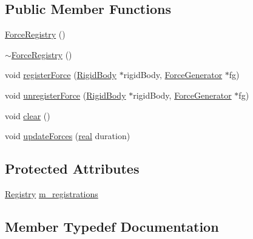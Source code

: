 \subsection*{Public Member Functions}
\begin{DoxyCompactItemize}
\item 
\mbox{\hyperlink{classr3_1_1_force_registry_a6830132c53a756ebf3e6621195f51b17}{Force\+Registry}} ()
\item 
\mbox{\hyperlink{classr3_1_1_force_registry_a322cdf54468a6f59610562a7bfc2e60d}{$\sim$\+Force\+Registry}} ()
\item 
void \mbox{\hyperlink{classr3_1_1_force_registry_a2b86303ed6ac2082606b298301f9957c}{register\+Force}} (\mbox{\hyperlink{classr3_1_1_rigid_body}{Rigid\+Body}} $\ast$rigid\+Body, \mbox{\hyperlink{classr3_1_1_force_generator}{Force\+Generator}} $\ast$fg)
\item 
void \mbox{\hyperlink{classr3_1_1_force_registry_a3a6163fed4266bd6e18ebad2c5c939cd}{unregister\+Force}} (\mbox{\hyperlink{classr3_1_1_rigid_body}{Rigid\+Body}} $\ast$rigid\+Body, \mbox{\hyperlink{classr3_1_1_force_generator}{Force\+Generator}} $\ast$fg)
\item 
void \mbox{\hyperlink{classr3_1_1_force_registry_ab1c31bc403d998af16df97ff5d42c95f}{clear}} ()
\item 
void \mbox{\hyperlink{classr3_1_1_force_registry_a34d6ad7472e2f47dfd3416a703eca78e}{update\+Forces}} (\mbox{\hyperlink{namespacer3_ab2016b3e3f743fb735afce242f0dc1eb}{real}} duration)
\end{DoxyCompactItemize}
\subsection*{Protected Attributes}
\begin{DoxyCompactItemize}
\item 
\mbox{\hyperlink{classr3_1_1_force_registry_a91449a71b1a33d773ef787ae56ae9b2d}{Registry}} \mbox{\hyperlink{classr3_1_1_force_registry_a36847da26301dc4b18e6b6b25fb2fa51}{m\+\_\+registrations}}
\end{DoxyCompactItemize}


\subsection{Member Typedef Documentation}
\mbox{\label{classr3_1_1_force_registry_a91449a71b1a33d773ef787ae56ae9b2d}} 
